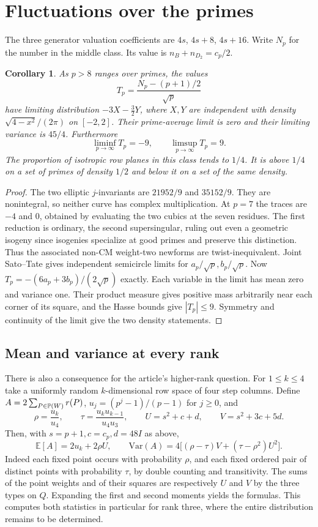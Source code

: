 \documentclass[11pt]{article}
\newtheorem{corollary}[theorem]{Corollary}
\begin{document}
\section{Fluctuations over the primes}
The three generator valuation coefficients are $4s$, $4s+8$,
$4s+16$. Write $N_p$ for the number in the middle class. Its
value is $n_B+n_{D_2}=c_p/2$.

\begin{corollary}\label{cor:st}
As $p>8$ ranges over primes, the values
\[
 T_p=\frac{N_p-(p+1)/2}{\sqrt p}
\]
have limiting distribution $-3X-\tfrac32Y$, where $X,Y$ are independent
with density $\sqrt{4-x^2}/(2\pi)$ on $[-2,2]$. Their prime-average
limit is zero and their limiting variance is $45/4$. Furthermore
\[
 \liminf_{p\to\infty}T_p=-9,\qquad \limsup_{p\to\infty}T_p=9 .
\]
The proportion of isotropic row planes in this class tends to $1/4$.
It is above $1/4$ on a set of primes of density $1/2$ and below it
on a set of the same density.
\end{corollary}
\begin{proof}
The two elliptic $j$-invariants are $21952/9$ and $35152/9$.
They are nonintegral, so neither curve has complex multiplication.
At $p=7$ the traces are $-4$ and $0$, obtained by evaluating the
two cubics at the seven residues. The first reduction is ordinary,
the second supersingular, ruling out even a geometric isogeny
since isogenies specialize at good primes and preserve this
distinction. Thus the associated non-CM weight-two newforms are
twist-inequivalent. Joint Sato--Tate \cite[Thm.~1.2]{thorner}
gives independent semicircle limits for $a_p/\sqrt p,b_p/\sqrt p$.
Now $T_p=-(6a_p+3b_p)/(2\sqrt p)$ exactly. Each variable in the
limit has mean zero and variance one. Their product measure gives
positive mass arbitrarily near each corner of its square, and the
Hasse bounds give $|T_p|\le9$. Symmetry and continuity of the limit
give the two density statements.
\end{proof}

\subsection*{Mean and variance at every rank}
There is also a consequence for the article's higher-rank question.
For $1\le k\le4$ take a uniformly random $k$-dimensional row space
of four step columns. Define $A=2\sum_{P\in\mathbb P(W)}r(P)$,
$u_j=(p^j-1)/(p-1)$ for $j\ge0$, and
\[
 \rho=\frac{u_k}{u_4},\qquad
 \tau=\frac{u_k u_{k-1}}{u_4 u_3},\qquad
 U=s^2+c+d,\qquad V=s^2+3c+5d.
\]
Then, with $s=p+1,c=c_p,d=48I$ as above,
\[
 \mathbb E[A]=2u_k+2\rho U,\qquad
 \mathrm{Var}(A)=4\big[(\rho-\tau)V+(\tau-\rho^2)U^2\big].
\]
Indeed each fixed point occurs with probability $\rho$, and each
fixed ordered pair of distinct points with probability $\tau$, by
double counting and transitivity. The sums of the point weights and
of their squares are respectively $U$ and $V$ by the three types
on $Q$. Expanding the first and second moments yields the formulas.
This computes both statistics in particular for rank three, where
the entire distribution remains to be determined.
\end{document}
